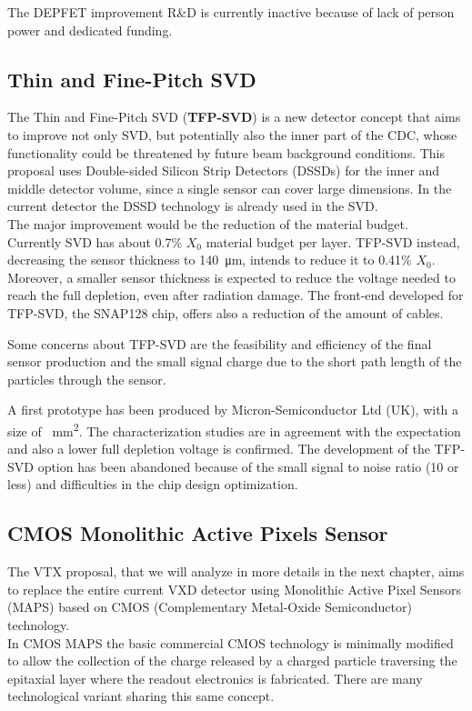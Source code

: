 The DEPFET improvement R\&D is currently inactive because of lack of person power and dedicated funding.

\subsection{Thin and Fine-Pitch SVD}

The Thin and Fine-Pitch SVD (\textbf{TFP-SVD}) is a new detector concept that aims to improve not only SVD, but potentially also the inner part of the CDC, whose functionality could be threatened by future beam background conditions.
This proposal uses Double-sided Silicon Strip Detectors (DSSDs) for the inner and middle detector volume, since a single sensor can cover large dimensions. In the current detector the DSSD technology is already used in the SVD. \\

The major improvement would be the reduction of the material budget.
Currently SVD has about 0.7\% $X_{0}$ material budget per layer. TFP-SVD instead, decreasing the sensor thickness to \SI{140}{\micro m}, intends to reduce it to 0.41\% $X_{0}$. 
Moreover, a smaller sensor thickness is expected to reduce the voltage needed to reach the full depletion, even after radiation damage. 
The front-end developed for TFP-SVD, the SNAP128 chip, offers also a reduction of the amount of cables.


Some concerns about TFP-SVD are the feasibility and efficiency of the final sensor production and the small signal charge due to the short path length of the particles through the sensor.

A first prototype has been produced by Micron-Semiconductor Ltd (UK), with a size of ~\unit{mm^{2}}. The characterization studies are in agreement with the expectation and also a lower full depletion voltage is confirmed.
The development of the TFP-SVD option has been abandoned because of the small signal to noise ratio (10 or less) and difficulties in the chip design optimization.


\subsection{CMOS Monolithic Active Pixels Sensor}

The VTX proposal, that we will analyze in more details in the next chapter, aims to replace the entire current VXD detector using Monolithic Active Pixel Sensors (MAPS) based on CMOS (Complementary Metal-Oxide Semiconductor) technology. \\
In CMOS MAPS the basic commercial CMOS technology is minimally modified to allow the collection of the charge released by a charged particle traversing the epitaxial layer where the readout electronics is fabricated. There are many technological variant sharing this same concept.

